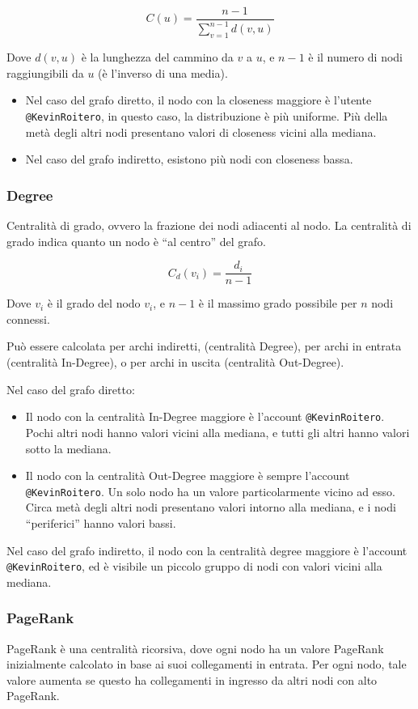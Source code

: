\documentclass[a4paper, 11pt, twoside]{article}
\begin{document}
$$
    C(u)=\frac{n-1}{\sum_{v=1}^{n-1}d(v,u)}
$$

Dove $d(v,u)$ è la lunghezza del cammino da $v$ a $u$, e $n-1$ è il numero di nodi raggiungibili da $u$ (è l'inverso di una media).

\begin{itemize}
    \item Nel caso del grafo diretto, il nodo con la closeness maggiore è l'utente \texttt{@KevinRoitero}, in questo caso, la distribuzione è più uniforme. Più della metà degli altri nodi presentano valori di closeness vicini alla mediana.
    \item Nel caso del grafo indiretto, esistono più nodi con closeness bassa.
\end{itemize}

\subsubsection{Degree}
Centralità di grado, ovvero la frazione dei nodi adiacenti al nodo. La centralità di grado indica quanto un nodo è ``al centro'' del grafo.

$$
    C_{d}(v_i)=\frac{d_i}{n-1}
$$

Dove $v_i$ è il grado del nodo $v_i$, e $n-1$ è il massimo grado possibile per $n$ nodi connessi.

Può essere calcolata per archi indiretti, (centralità Degree), per archi in entrata (centralità In-Degree), o per archi in uscita (centralità Out-Degree).

Nel caso del grafo diretto:
\begin{itemize}
    \item Il nodo con la centralità In-Degree maggiore è l'account \texttt{@KevinRoitero}. Pochi altri nodi hanno valori vicini alla mediana, e tutti gli altri hanno valori sotto la mediana.
    \item Il nodo con la centralità Out-Degree maggiore è sempre l'account \texttt{@KevinRoitero}. Un solo nodo ha un valore particolarmente vicino ad esso. Circa metà degli altri nodi presentano valori intorno alla mediana, e i nodi ``periferici'' hanno valori bassi.
\end{itemize}
Nel caso del grafo indiretto, il nodo con la centralità degree maggiore è l'account \texttt{@KevinRoitero}, ed è visibile un piccolo gruppo di nodi con valori vicini alla mediana.

\subsubsection{PageRank}
PageRank è una centralità ricorsiva, dove ogni nodo ha un valore PageRank inizialmente calcolato in base ai suoi collegamenti in entrata. Per ogni nodo, tale valore aumenta se questo ha collegamenti in ingresso da altri nodi con alto PageRank.
\end{document}
